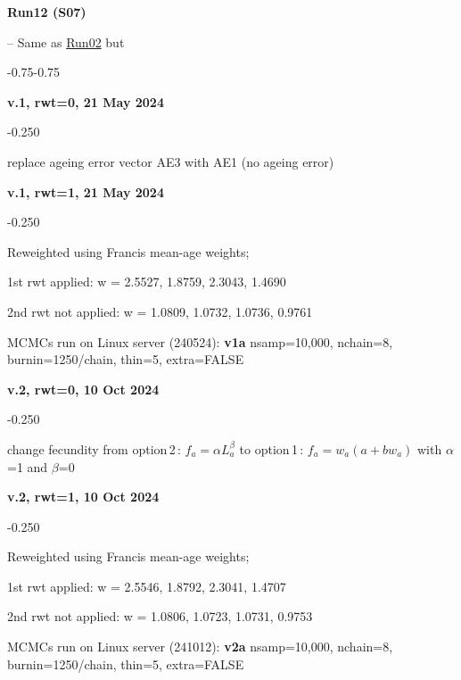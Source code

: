\hypertarget{R12}{\textbf{Run12 (S07)}} -- Same as \hyperlink{R02}{Run02} but
\begin{itemize_csas}{-0.75}{-0.75}
	\item \textbf{v.1, rwt=0, 21 May 2024}
	\begin{itemize_csas}{-0.25}{0}
		\item replace ageing error vector AE3 with AE1 (no ageing error)
	\end{itemize_csas}
	\item \textbf{v.1, rwt=1, 21 May 2024}
	\begin{itemize_csas}{-0.25}{0}
		\item Reweighted using Francis mean-age weights;
		\item 1st rwt applied: w = 2.5527, 1.8759, 2.3043, 1.4690
		\item 2nd rwt not applied: w = 1.0809, 1.0732, 1.0736, 0.9761
		\item MCMCs run on Linux server (240524): \textbf{v1a} nsamp=10,000, nchain=8, burnin=1250/chain, thin=5, extra=FALSE
	\end{itemize_csas}
	\item \textbf{v.2, rwt=0, 10 Oct 2024}
	\begin{itemize_csas}{-0.25}{0}
		\item change fecundity from option\,2\,: $f_a = \alpha L_a^{\beta}$ to option\,1\,:  $f_a = w_a (a + b w_a)$ with $\alpha$=1 and $\beta$=0
	\end{itemize_csas}
	\item \textbf{v.2, rwt=1, 10 Oct 2024}
	\begin{itemize_csas}{-0.25}{0}
		\item Reweighted using Francis mean-age weights;
		\item 1st rwt applied: w = 2.5546, 1.8792, 2.3041, 1.4707
		\item 2nd rwt not applied: w = 1.0806, 1.0723, 1.0731, 0.9753
		\item MCMCs run on Linux server (241012): \textbf{v2a} nsamp=10,000, nchain=8, burnin=1250/chain, thin=5, extra=FALSE
	\end{itemize_csas}
\end{itemize_csas}

